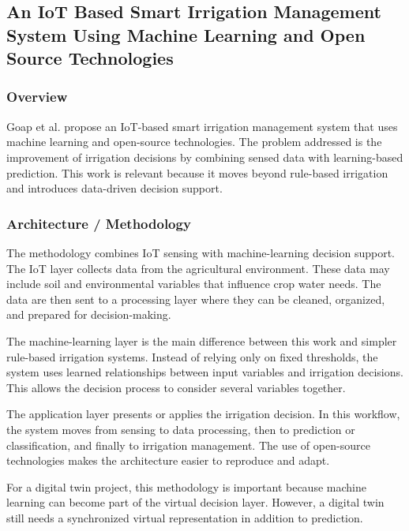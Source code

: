 \subsection[An IoT Based Smart Irrigation Management System Using Machine Learning and Open Source Technologies]{An IoT Based Smart Irrigation Management System Using Machine Learning and Open Source Technologies \cite{goap2018iotMLIrrigation}}

\subsubsection{Overview}

Goap et al. propose an IoT-based smart irrigation management system that uses machine learning and open-source technologies. The problem addressed is the improvement of irrigation decisions by combining sensed data with learning-based prediction. This work is relevant because it moves beyond rule-based irrigation and introduces data-driven decision support.

\subsubsection{Architecture / Methodology}

The methodology combines IoT sensing with machine-learning decision support. The IoT layer collects data from the agricultural environment. These data may include soil and environmental variables that influence crop water needs. The data are then sent to a processing layer where they can be cleaned, organized, and prepared for decision-making.

The machine-learning layer is the main difference between this work and simpler rule-based irrigation systems. Instead of relying only on fixed thresholds, the system uses learned relationships between input variables and irrigation decisions. This allows the decision process to consider several variables together.

The application layer presents or applies the irrigation decision. In this workflow, the system moves from sensing to data processing, then to prediction or classification, and finally to irrigation management. The use of open-source technologies makes the architecture easier to reproduce and adapt.

For a digital twin project, this methodology is important because machine learning can become part of the virtual decision layer. However, a digital twin still needs a synchronized virtual representation in addition to prediction.

